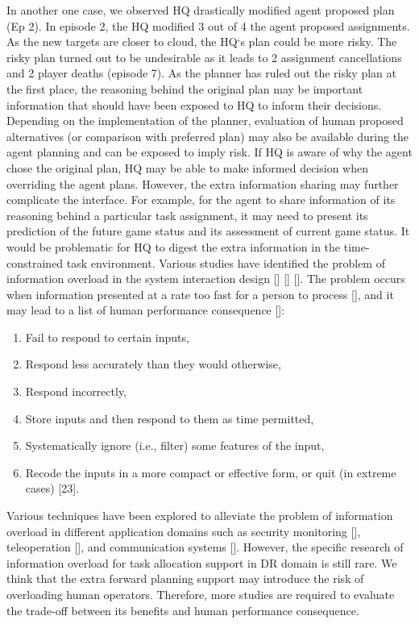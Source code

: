 In another one case, we observed HQ drastically modified agent proposed plan (Ep 2). In episode 2, the HQ modified 3 out of 4 the agent proposed assignments. As the new targets are closer to cloud, the HQ`s plan could be more risky. The risky plan turned out to be undesirable as it leads to 2 assignment cancellations and 2 player deaths (episode 7). As the planner has ruled out the risky plan at the first place, the reasoning behind the original plan may be important information that should have been exposed to HQ to inform their decisions. Depending on the implementation of the planner, evaluation of human proposed alternatives (or comparison with preferred plan) may also be available during the agent planning and can be exposed to imply risk. If HQ is aware of why the agent chose the original plan, HQ may be able to make informed decision when overriding the agent plans. However, the extra information sharing may further complicate the interface. For example, for the agent to share information of its reasoning behind a particular task assignment, it may need to present its prediction of the future game status and its assessment of current game status. It would be problematic for HQ to digest the extra information in the time-constrained task environment. Various studies have identified the problem of information overload in the system interaction design [] [] []. The problem occurs when information presented at a rate too fast for a person to process [], and it may lead to a list of human performance consequence []:

\begin{enumerate}
\item Fail to respond to certain inputs,
\item Respond less accurately than they would otherwise,
\item Respond incorrectly,
\item Store inputs and then respond to them as time permitted,
\item Systematically ignore (i.e., filter) some features of the input,
\item Recode the inputs in a more compact or effective form, or quit (in extreme cases) [23].
\end{enumerate}

Various techniques have been explored to alleviate the problem of information overload in different application domains such as security monitoring [], teleoperation [], and communication systems []. However, the specific research of information overload for task allocation support in DR domain is still rare. We think that the extra forward planning support may introduce the risk of overloading human operators. Therefore, more studies are required to evaluate the trade-off between its benefits and human performance consequence.

